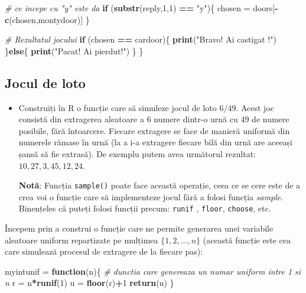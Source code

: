 \documentclass[]{article}
\newenvironment{Shaded}{\begin{snugshade}}{\end{snugshade}}
\newcommand{\KeywordTok}[1]{\textcolor[rgb]{0.13,0.29,0.53}{\textbf{#1}}}
\newcommand{\DecValTok}[1]{\textcolor[rgb]{0.00,0.00,0.81}{#1}}
\newcommand{\StringTok}[1]{\textcolor[rgb]{0.31,0.60,0.02}{#1}}
\newcommand{\CommentTok}[1]{\textcolor[rgb]{0.56,0.35,0.01}{\textit{#1}}}
\newcommand{\ControlFlowTok}[1]{\textcolor[rgb]{0.13,0.29,0.53}{\textbf{#1}}}
\newcommand{\OperatorTok}[1]{\textcolor[rgb]{0.81,0.36,0.00}{\textbf{#1}}}
\newcommand{\NormalTok}[1]{#1}
\newenvironment{frshaded*}{%
  \def\FrameCommand{\fboxrule=\FrameRule\fboxsep=\FrameSep \fcolorbox{framecolor}{shadecolor1}}%
  \MakeFramed {\advance\hsize-\width \FrameRestore}}%
{\endMakeFramed}
\newenvironment{rmdblock}[1]
  {\begin{frshaded*}
  \begin{itemize}
  \renewcommand{\labelitemi}{
    \raisebox{-.7\height}[0pt][0pt]{
      {\setkeys{Gin}{width=2em,keepaspectratio}\texttt{[image: images/icons/\#1]}}
    }
  }
  \item
  }
  {
  \end{itemize}
  \end{frshaded*}
  }
\newenvironment{rmdexercise}
  {\begin{rmdblock}{exercise}}
  {\end{rmdblock}}
\begin{document}
\begin{Shaded}
\begin{Highlighting}[]
  \CommentTok{# ce incepe cu "y" este da}
  \ControlFlowTok{if}\NormalTok{ (}\KeywordTok{substr}\NormalTok{(reply,}\DecValTok{1}\NormalTok{,}\DecValTok{1}\NormalTok{) }\OperatorTok{==}\StringTok{ "y"}\NormalTok{)\{}
\NormalTok{    chosen =}\StringTok{ }\NormalTok{doors[}\OperatorTok{-}\KeywordTok{c}\NormalTok{(chosen,montydoor)]}
\NormalTok{  \} }
  
  \CommentTok{# Rezultatul jocului}
  \ControlFlowTok{if}\NormalTok{ (chosen }\OperatorTok{==}\StringTok{ }\NormalTok{cardoor)\{}
    \KeywordTok{print}\NormalTok{(}\StringTok{"Bravo! Ai castigat !"}\NormalTok{)}
\NormalTok{  \}}\ControlFlowTok{else}\NormalTok{\{}
    \KeywordTok{print}\NormalTok{(}\StringTok{"Pacat! Ai pierdut!"}\NormalTok{)}
\NormalTok{  \} }
\NormalTok{\}}
\end{Highlighting}
\end{Shaded}

\subsection{Jocul de loto}\label{jocul-de-loto}

\begin{rmdexercise}
Construiți în R o funcție care să simuleze jocul de loto \(6/49\). Acest
joc consistă din extragerea aleatoare a \(6\) numere dintr-o urnă cu
\(49\) de numere posibile, fără întoarcere. Fiecare extragere se face de
manieră uniformă din numerele rămase în urnă (la a i-a extragere fiecare
bilă din urnă are aceeași șansă să fie extrasă). De exemplu putem avea
următorul rezultat: \(10, 27, 3, 45, 12, 24\).

\textbf{Notă}: Funcția \texttt{sample()} poate face această operație,
ceea ce se cere este de a crea voi o funcție care să implementeze jocul
fără a folosi funcția \emph{sample}. Binențeles că puteți folosi funcții
precum: \texttt{runif} , \texttt{floor}, \texttt{choose}, etc.
\end{rmdexercise}

Începem prin a construi o funcție care ne permite generarea unei
variabile aleatoare uniform repartizate pe mulțimea \(\{1,2,\dots,n\}\)
(această funcție este cea care simulează procesul de extragere de la
fiecare pas):

\begin{Shaded}
\begin{Highlighting}[]
\NormalTok{myintunif =}\StringTok{ }\ControlFlowTok{function}\NormalTok{(n)\{}
  \CommentTok{# dunctia care genereaza un numar uniform intre 1 si n}
\NormalTok{  r =}\StringTok{ }\NormalTok{n}\OperatorTok{*}\KeywordTok{runif}\NormalTok{(}\DecValTok{1}\NormalTok{)}
\NormalTok{  u =}\StringTok{ }\KeywordTok{floor}\NormalTok{(r)}\OperatorTok{+}\DecValTok{1}
  \KeywordTok{return}\NormalTok{(u)}
\NormalTok{\}}
\end{Highlighting}
\end{Shaded}
\end{document}
